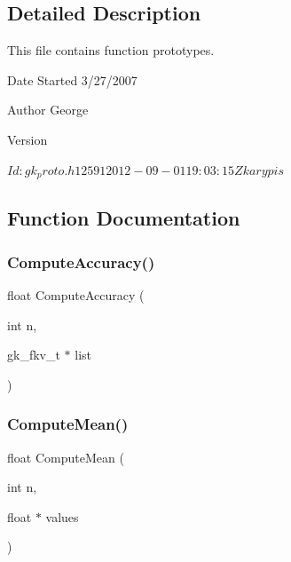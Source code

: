 \subsection{Detailed Description}
This file contains function prototypes. 

\begin{DoxyDate}{Date}
Started 3/27/2007 
\end{DoxyDate}
\begin{DoxyAuthor}{Author}
George 
\end{DoxyAuthor}
\begin{DoxyVersion}{Version}
\begin{DoxyVerb}$Id: gk_proto.h 12591 2012-09-01 19:03:15Z karypis $ \end{DoxyVerb}
 
\end{DoxyVersion}


\subsection{Function Documentation}
\mbox{\label{a00077_ae4d47a20b362605d1521159a9b090a04}} 
\subsubsection{\texorpdfstring{Compute\+Accuracy()}{ComputeAccuracy()}}
{\footnotesize\ttfamily float Compute\+Accuracy (\begin{DoxyParamCaption}\item[{int}]{n,  }\item[{gk\+\_\+fkv\+\_\+t $\ast$}]{list }\end{DoxyParamCaption})}

\mbox{\label{a00077_aeeed505299d523a6061b0c1966d88427}} 
\subsubsection{\texorpdfstring{Compute\+Mean()}{ComputeMean()}}
{\footnotesize\ttfamily float Compute\+Mean (\begin{DoxyParamCaption}\item[{int}]{n,  }\item[{float $\ast$}]{values }\end{DoxyParamCaption})}

